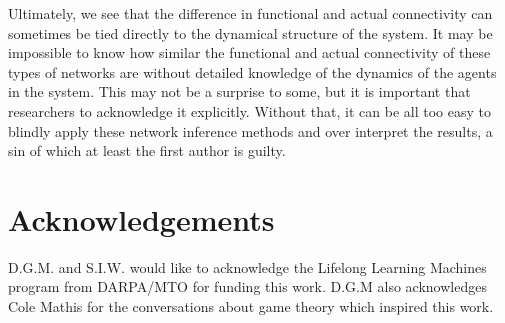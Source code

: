 \documentclass[letterpaper]{article}
\begin{document}
Ultimately, we see that the difference in functional and actual connectivity can sometimes be tied directly to the dynamical structure of the system. It may be impossible to know how similar the functional and actual connectivity of these types of networks are without detailed knowledge of the dynamics of the agents in the system. This may not be a surprise to some, but it is important that researchers to acknowledge it explicitly. Without that, it can be all too easy to blindly apply these network inference methods and over interpret the results, a sin of which at least the first author is guilty.

\section{Acknowledgements}
D.G.M. and S.I.W. would like to acknowledge the Lifelong Learning Machines program from DARPA/MTO for funding this work. D.G.M also acknowledges Cole Mathis for the conversations about game theory which inspired this work.

\footnotesize


\end{document}
